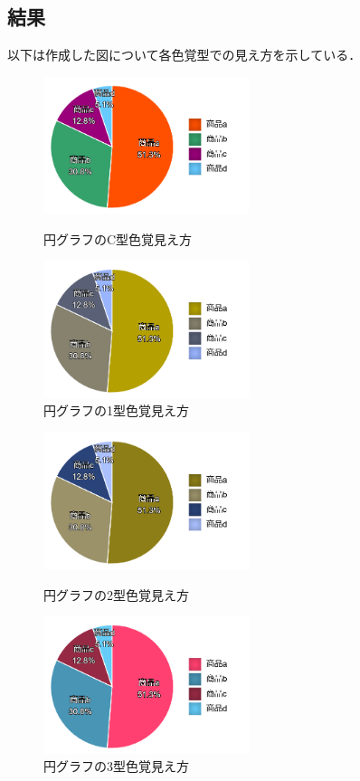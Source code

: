 \documentclass[titlepage]{jlreq}
\begin{document}
\subsection{結果}
以下は作成した図について各色覚型での見え方を示している．

\begin{figure}[H]
    \begin{minipage}[b]{0.49\columnwidth}
        \includegraphics[width=6cm]{circle_fixed.png}
        \centering
        \caption{円グラフのC型色覚見え方}
    \end{minipage}
    \begin{minipage}[b]{0.49\columnwidth}
        \includegraphics[width=6cm]{circle_fixed_deuteranope.png}
        \centering
        \caption{円グラフの1型色覚見え方}
    \end{minipage}
\end{figure}

\begin{figure}[H]
    \begin{minipage}[b]{0.49\columnwidth}
        \includegraphics[width=6cm]{circle_fixed_protanope.png}
        \centering
        \caption{円グラフの2型色覚見え方}
    \end{minipage}
    \begin{minipage}[b]{0.49\columnwidth}
        \includegraphics[width=6cm]{circle_fixed_tritanope.png}
        \centering
        \caption{円グラフの3型色覚見え方}
    \end{minipage}
\end{figure}
\end{document}
